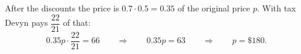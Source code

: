 After the discounts the price is $0.7\cdot0.5=0.35$ of the original price $p$. With tax Devyn pays $\dfrac{22}{21}$ of that:
\[0.35p\cdot\dfrac{22}{21}=66\qquad\Longrightarrow\qquad0.35p=63\qquad\Longrightarrow\qquad p=\boxed{\$180}.\]
